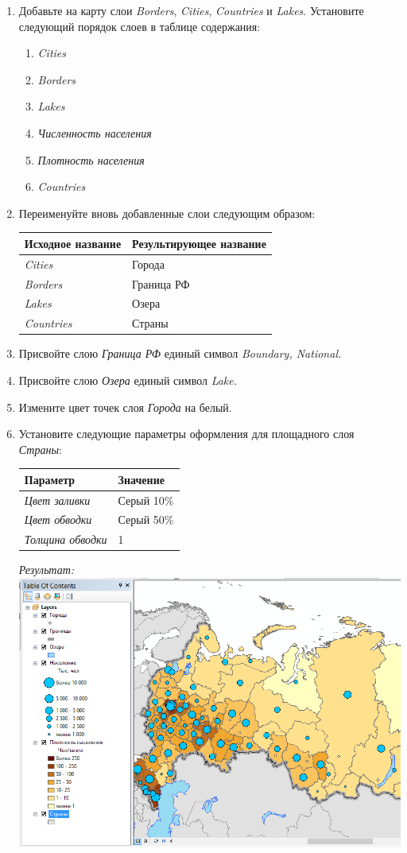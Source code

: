 \documentclass[]{book}
\providecommand{\tightlist}{%
  \setlength{\itemsep}{0pt}\setlength{\parskip}{0pt}}
\theoremstyle{definition}
\theoremstyle{definition}
\theoremstyle{definition}
\theoremstyle{remark}
\begin{document}
\begin{enumerate}
\def\labelenumi{\arabic{enumi}.}
\item
  Добавьте на карту слои \emph{Borders}, \emph{Cities}, \emph{Countries}
  и \emph{Lakes}. Установите следующий порядок слоев в таблице
  содержания:

  \begin{enumerate}
  \def\labelenumii{\alph{enumii}.}
  \tightlist
  \item
    \emph{Cities}
  \item
    \emph{Borders}
  \item
    \emph{Lakes}
  \item
    \emph{Численность населения}
  \item
    \emph{Плотность населения}
  \item
    \emph{Countries}
  \end{enumerate}
\item
  Переименуйте вновь добавленные слои следующим образом:

  \begin{longtable}[]{@{}ll@{}}
  \toprule
  \textbf{Исходное название} & \textbf{Результирующее
  название}\tabularnewline
  \midrule
  \endhead
  \emph{Cities} & Города\tabularnewline
  \emph{Borders} & Граница РФ\tabularnewline
  \emph{Lakes} & Озера\tabularnewline
  \emph{Countries} & Страны\tabularnewline
  \bottomrule
  \end{longtable}
\item
  Присвойте слою \emph{Граница РФ} единый символ \emph{Boundary,
  National.}
\item
  Присвойте слою \emph{Озера} единый символ \emph{Lake.}
\item
  Измените цвет точек слоя \emph{Города} на белый.
\item
  Установите следующие параметры оформления для площадного слоя
  \emph{Страны}:

  \begin{longtable}[]{@{}ll@{}}
  \toprule
  \textbf{Параметр} & \textbf{Значение}\tabularnewline
  \midrule
  \endhead
  \emph{Цвет заливки} & Серый 10\%\tabularnewline
  \emph{Цвет обводки} & Серый 50\%\tabularnewline
  \emph{Толщина обводки} & 1\tabularnewline
  \bottomrule
  \end{longtable}

  \emph{Результат:} \includegraphics{images/Ex04/image25.png}


\end{enumerate}
\end{document}
